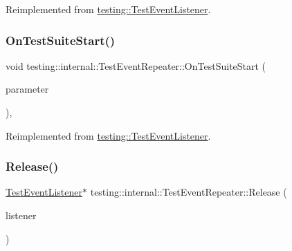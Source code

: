 Reimplemented from \mbox{\hyperlink{classtesting_1_1_test_event_listener_a2726cc70dfda861f109355f1d9f09dfe}{testing\+::\+Test\+Event\+Listener}}.

\mbox{\label{classtesting_1_1internal_1_1_test_event_repeater_aa54fdafe6dfdd46dbac108c17016a5f9}} 
\subsubsection{\texorpdfstring{OnTestSuiteStart()}{OnTestSuiteStart()}\hspace{0.1cm}{\footnotesize\ttfamily [2/2]}}
{\footnotesize\ttfamily void testing\+::internal\+::\+Test\+Event\+Repeater\+::\+On\+Test\+Suite\+Start (\begin{DoxyParamCaption}\item[{const \mbox{\hyperlink{classtesting_1_1_test_suite}{Test\+Suite}} \&}]{parameter }\end{DoxyParamCaption})\hspace{0.3cm}{\ttfamily [override]}, {\ttfamily [virtual]}}



Reimplemented from \mbox{\hyperlink{classtesting_1_1_test_event_listener_a2726cc70dfda861f109355f1d9f09dfe}{testing\+::\+Test\+Event\+Listener}}.

\mbox{\label{classtesting_1_1internal_1_1_test_event_repeater_a6aae8ac4eb3d9aa655f2ba71673dfd06}} 
\subsubsection{\texorpdfstring{Release()}{Release()}\hspace{0.1cm}{\footnotesize\ttfamily [1/3]}}
{\footnotesize\ttfamily \mbox{\hyperlink{classtesting_1_1_test_event_listener}{Test\+Event\+Listener}}$\ast$ testing\+::internal\+::\+Test\+Event\+Repeater\+::\+Release (\begin{DoxyParamCaption}\item[{\mbox{\hyperlink{classtesting_1_1_test_event_listener}{Test\+Event\+Listener}} $\ast$}]{listener }\end{DoxyParamCaption})}

